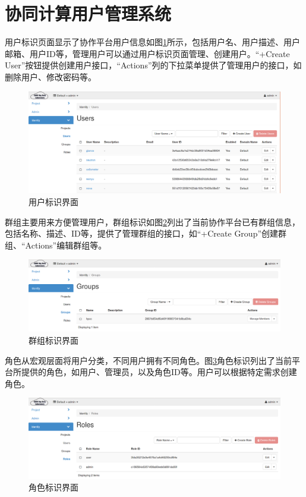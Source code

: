 \documentclass[12pt]{ctexart}%
\begin{document}
\section{协同计算用户管理系统}  
用户标识页面显示了协作平台用户信息如图\ref{fig:identityusers}所示，包括用户名、用户描述、用户邮箱、用户ID等，管理用户可以通过用户标识页面管理、创建用户。“+Create User”按钮提供创建用户接口，“Actions”列的下拉菜单提供了管理用户的接口，如删除用户、修改密码等。
\begin{figure}[!htb]
\centering
\includegraphics[width=6in]{./figures/Identity_Users}
\caption{用户标识界面}
\label{fig:identityusers}
\end{figure}
群组主要用来方便管理用户，群组标识如图\ref{fig:identitygroups}列出了当前协作平台已有群组信息，包括名称、描述、ID等，提供了管理群组的接口，如“+Create Group”创建群组、“Actions”编辑群组等。
\begin{figure}[!htb]
\centering
\includegraphics[width=6in]{./figures/Identity_Groups}
\caption{群组标识界面}
\label{fig:identitygroups}
\end{figure}
角色从宏观层面将用户分类，不同用户拥有不同角色。图\ref{fig:identityroles}角色标识列出了当前平台所提供的角色，如用户、管理员，以及角色ID等。用户可以根据特定需求创建角色。
\begin{figure}[!htb]
\centering
\includegraphics[width=6in]{./figures/Identity_Roles}
\caption{角色标识界面}
\label{fig:identityroles}
\end{figure}
\end{document}
